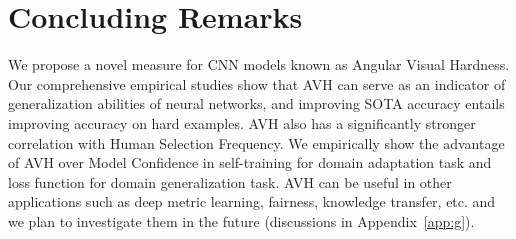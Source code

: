 \section{Concluding Remarks}

We propose a novel measure for CNN models known as Angular Visual Hardness. Our comprehensive empirical studies show that AVH can serve as an indicator of generalization abilities of neural networks, and improving SOTA accuracy entails improving accuracy on hard examples. AVH also has a significantly stronger correlation with Human Selection Frequency. We empirically show the advantage of AVH over Model Confidence in self-training for domain adaptation task and loss function for domain generalization task. AVH can be useful in other applications such as deep metric learning, fairness, knowledge transfer, etc. and we plan to investigate them in the future (discussions in Appendix~\ref{app:g}).


